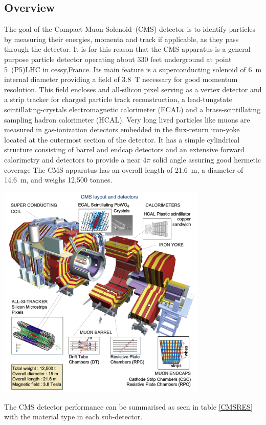 \subsection{Overview}
The goal of the  Compact Muon Solenoid~(CMS) detector is to identify particles by measuring their energies, momenta and track if applicable, as they pass through the detector. It is for this reason that the CMS apparatus is a general purpose particle detector operating about 330 feet underground at  point 5~(P5)LHC in cessy,France. Its main feature is a superconducting solenoid of 6~m internal diameter providing a field of 3.8~T necessary for good momentum resolution. 
This field  encloses and all-silicon pixel serving as a vertex detector and a strip tracker for charged particle track reconstruction, a lead-tungstate scintillating-crystals electromagnetic calorimeter (ECAL) and a brass-scintillating sampling hadron calorimeter (HCAL). Very long lived particles like muons are measured in gas-ionization detectors embedded in the flux-return iron-yoke located at the outermost section of the detector.
It has a simple cylindrical structure consisting of barrel and endcap detectors and an extensive forward calorimetry and detectors to provide a near $4\pi$ solid angle assuring good hermetic coverage
The CMS apparatus has an overall length of 21.6~m, a diameter of 14.6~m, and weighs 12,500 tonnes. 
\begin{center}
\centering
\mbox{\includegraphics[width=10cm]{THESISPLOTS/CMS_LAYOUT_AND_DETECTORS.png}} 
\label{fig:CMS-DET}
\end{center}
The CMS detector performance can be summarised as seen in table \eqref{CMSRES} with the material type in each sub-detector.

